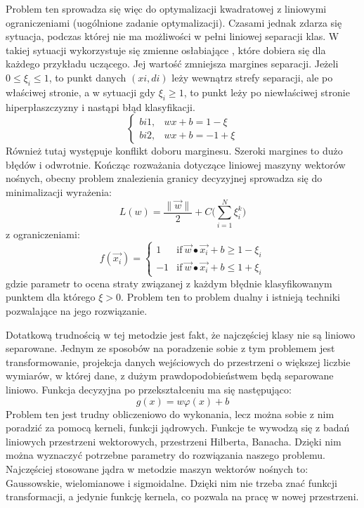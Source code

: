 Problem ten sprowadza się więc do optymalizacji kwadratowej z liniowymi ograniczeniami (uogólnione zadanie optymalizacji). 
Czasami jednak zdarza się sytuacja, podczas której nie ma możliwości w pełni liniowej separacji klas. W takiej sytuacji wykorzystuje się zmienne osłabiające , które dobiera się dla każdego przykładu uczącego. Jej wartość zmniejsza margines separacji. Jeżeli $0 \le \xi_{i} \le 1$, to punkt danych $(xi,di)$ leży wewnątrz strefy separacji, ale po właściwej stronie, a w sytuacji gdy $\xi_{i} \ge 1$, to punkt leży po niewłaściwej stronie hiperpłaszczyzny i nastąpi błąd klasyfikacji. 
\[
    \begin{cases}
            bi1,&  wx+b = 1 - \xi\\
            bi2,& wx+b= -1 + \xi
    \end{cases}
\]
Również tutaj występuje konflikt doboru marginesu. Szeroki margines to dużo błędów i odwrotnie. Kończąc rozważania dotyczące liniowej maszyny wektorów nośnych, obecny problem znalezienia granicy decyzyjnej sprowadza się do minimalizacji wyrażenia:
\[
L(w) = \frac{\|\vec{w}\|}{2} + C\big(\sum_{i=1}^{N}\xi_{i}^{k}\big)
\]
z ograniczeniami:
\[
f(\vec{x_{i}}) = 
    \begin{cases}
            1 &  \text{if}\ \vec{w} \bullet \vec{x_{i}}+b \ge 1 - \xi_{i}\\
            -1 &  \text{if}\ \vec{w} \bullet \vec{x_{i}}+b \le 1 + \xi_{i}
    \end{cases}
\]
gdzie parametr  to ocena straty związanej z każdym błędnie klasyfikowanym punktem dla którego $\xi > 0$. Problem ten to problem dualny i istnieją techniki pozwalające na jego rozwiązanie.

Dotatkową trudnością w tej metodzie jest fakt, że najczęściej klasy nie są liniowo separowane. Jednym ze sposobów na poradzenie sobie z tym problemem jest transformowanie, projekcja danych wejściowych do przestrzeni o większej liczbie wymiarów, w której dane, z dużym prawdopodobieństwem będą separowane liniowo. Funkcja decyzyjna po przekształceniu ma się następująco:
\[
g(x) = w\varphi(x) + b
\]
Problem ten jest trudny obliczeniowo do wykonania, lecz można sobie z nim poradzić za pomocą kerneli, funkcji jądrowych. Funkcje te wywodzą się z badań liniowych przestrzeni wektorowych, przestrzeni Hilberta, Banacha. Dzięki nim można wyznaczyć potrzebne parametry do rozwiązania naszego problemu. Najczęściej stosowane jądra w metodzie maszyn wektorów nośnych to: Gaussowskie, wielomianowe i sigmoidalne. Dzięki nim nie trzeba znać funkcji transformacji, a jedynie funkcję kernela, co pozwala na pracę w nowej przestrzeni. 

